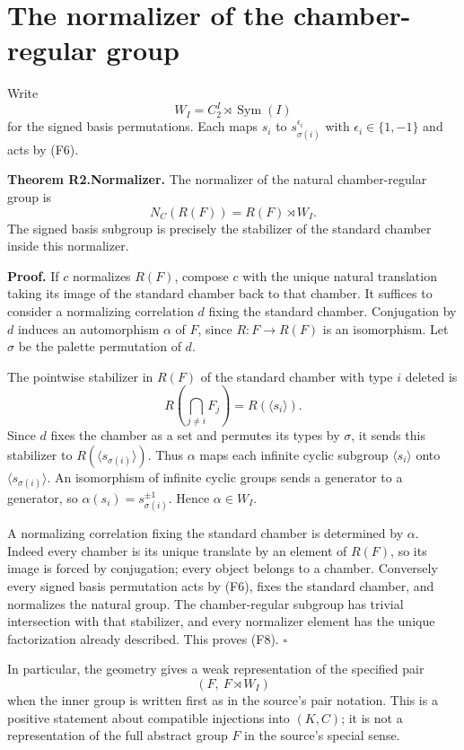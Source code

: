 \section{The normalizer of the chamber-regular
group}\label{the-normalizer-of-the-chamber-regular-group}

Write \[
W_I=C_2^I\rtimes\operatorname{Sym}(I)
\] for the signed basis permutations. Each maps \(s_i\) to
\(s_{\sigma(i)}^{\epsilon_i}\) with \(\epsilon_i\in\{1,-1\}\) and acts
by (F6).

\textbf{Theorem R2.Normalizer.} The normalizer of the natural
chamber-regular group is \[
N_C(R(F))=R(F)\rtimes W_I.
\tag{F8}
\] The signed basis subgroup is precisely the stabilizer of the standard
chamber inside this normalizer.

\textbf{Proof.} If \(c\) normalizes \(R(F)\), compose \(c\) with the
unique natural translation taking its image of the standard chamber back
to that chamber. It suffices to consider a normalizing correlation \(d\)
fixing the standard chamber. Conjugation by \(d\) induces an
automorphism \(\alpha\) of \(F\), since \(R:F\to R(F)\) is an
isomorphism. Let \(\sigma\) be the palette permutation of \(d\).

The pointwise stabilizer in \(R(F)\) of the standard chamber with type
\(i\) deleted is \[
R\!\left(\bigcap_{j\ne i}F_j\right)=R(\langle s_i\rangle).
\] Since \(d\) fixes the chamber as a set and permutes its types by
\(\sigma\), it sends this stabilizer to
\(R(\langle s_{\sigma(i)}\rangle)\). Thus \(\alpha\) maps each infinite
cyclic subgroup \(\langle s_i\rangle\) onto
\(\langle s_{\sigma(i)}\rangle\). An isomorphism of infinite cyclic
groups sends a generator to a generator, so
\(\alpha(s_i)=s_{\sigma(i)}^{\pm1}\). Hence \(\alpha\in W_I\).

A normalizing correlation fixing the standard chamber is determined by
\(\alpha\). Indeed every chamber is its unique translate by an element
of \(R(F)\), so its image is forced by conjugation; every object belongs
to a chamber. Conversely every signed basis permutation acts by (F6),
fixes the standard chamber, and normalizes the natural group. The
chamber-regular subgroup has trivial intersection with that stabilizer,
and every normalizer element has the unique factorization already
described. This proves (F8). \(\square\)

In particular, the geometry gives a weak representation of the specified
pair \[
(F,\ F\rtimes W_I)
\] when the inner group is written first as in the source's pair
notation. This is a positive statement about compatible injections into
\((K,C)\); it is not a representation of the full abstract group \(F\)
in the source's special sense.

